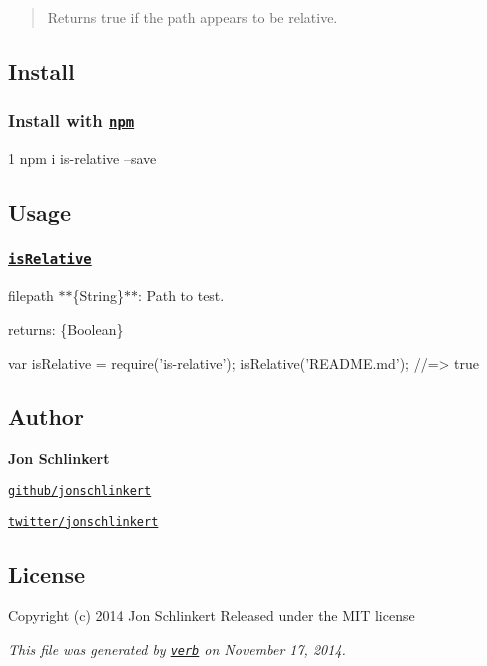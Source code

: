 \begin{quote}
Returns {\ttfamily true} if the path appears to be relative. \end{quote}


\subsection*{Install}

\subsubsection*{Install with \href{npmjs.org}{\tt npm}}


\begin{DoxyCode}
1 npm i is-relative --save
\end{DoxyCode}


\subsection*{Usage}

\subsubsection*{\href{index.js#L16}{\tt is\+Relative}}


\begin{DoxyItemize}
\item {\ttfamily filepath} $\ast$$\ast$\{String\}$\ast$$\ast$\+: Path to test.
\item {\ttfamily returns}\+: \{Boolean\}
\end{DoxyItemize}


\begin{DoxyCode}
var isRelative = require(\textcolor{stringliteral}{'is-relative'});
isRelative(\textcolor{stringliteral}{'README.md'});
\textcolor{comment}{//=> true}
\end{DoxyCode}


\subsection*{Author}

{\bfseries Jon Schlinkert}


\begin{DoxyItemize}
\item \href{https://github.com/jonschlinkert}{\tt github/jonschlinkert}
\item \href{http://twitter.com/jonschlinkert}{\tt twitter/jonschlinkert}
\end{DoxyItemize}

\subsection*{License}

Copyright (c) 2014 Jon Schlinkert Released under the M\+I\+T license





{\itshape This file was generated by \href{https://github.com/assemble/verb}{\tt verb} on November 17, 2014.} 